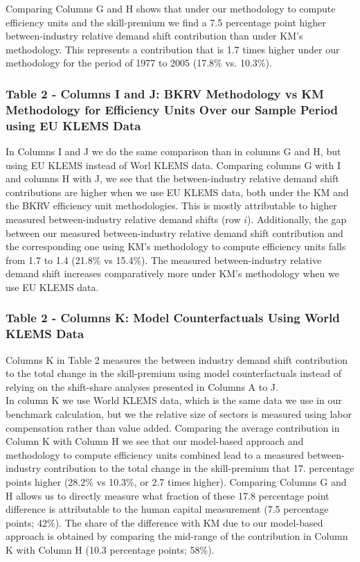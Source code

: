 \documentclass[10pt]{article}
\begin{document}
Comparing Columns G and H shows that under our methodology to compute efficiency units and the skill-premium we find a 7.5 percentage point higher between-industry relative demand shift contribution than under KM's methodology. This represents a contribution that is 1.7 times higher under our methodology for the period of 1977 to 2005 (17.8\% vs. 10.3\%).

\subsubsection*{Table 2 - Columns I and J: BKRV Methodology vs KM Methodology for Efficiency Units Over our Sample Period using EU KLEMS Data}
In Columns I and J we do the same comparison than in columns G and H, but using EU KLEMS instead of Worl KLEMS data. Comparing columns G with I and columns H with J, we see that the between-industry relative demand shift contributions are higher when we use EU KLEMS data, both under the KM and the BKRV efficiency unit methodologies. This is mostly attributable to higher measured between-industry relative demand shifts (row $i$). Additionally, the gap between our measured between-industry relative demand shift contribution and the corresponding one using KM's methodology to compute efficiency units falls from 1.7 to 1.4 (21.8\% vs 15.4\%).  The measured between-industry relative demand shift increases comparatively more under KM's methodology when we use EU KLEMS data.

\subsubsection*{Table 2 - Columns K: Model Counterfactuals Using World KLEMS Data}
Columns K in Table 2 measures the between industry demand shift contribution to the total change in the skill-premium using model counterfactuals instead of relying on the shift-share analyses presented in Columns A to J.\\

In column K we use World KLEMS data, which is the same data we use in our benchmark calculation, but we the relative size of sectors is measured using labor compensation rather than value added. Comparing the average contribution in Column K with Column H we see that our model-based approach and methodology to compute efficiency units combined lead to a measured between-industry contribution to the total change in the skill-premium that 17. percentage points higher (28.2\% vs 10.3\%, or 2.7 times higher). Comparing Columns G and H allows us to directly measure what fraction of these 17.8 percentage point difference is attributable to the human capital measurement (7.5 percentage points; 42\%). The share of the difference with KM due to our model-based approach is obtained by comparing the mid-range of the contribution in Column K with Column H (10.3 percentage points; 58\%).  
\end{document}
